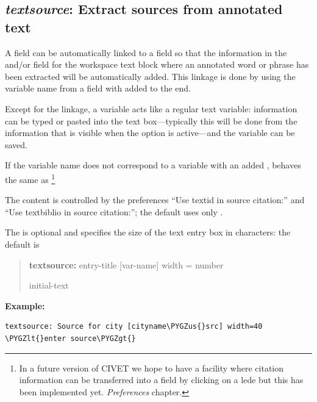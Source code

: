 \documentclass[letterpaper,10pt,english]{sphinxmanual}
\def\PYGZus{\char`\_}
\def\PYGZlt{\char`\<}
\def\PYGZgt{\char`\>}
\begin{document}
\subsection{\emph{textsource}: Extract sources from annotated text}
\label{forms:textsource-extract-sources-from-annotated-text}
A  field can be automatically linked to a 
field so that the information in the  and/or  field
for the workspace text block where an annotated word or phrase has been
extracted will be automatically added. This linkage is done by using
the variable name from a  field with  added to the
end.

Except for the linkage, a  variable acts like a regular text
variable: information can be typed or pasted into the text box—typically this
will be done from the  information that is visible when the
 option is active—and the variable can be saved.

If the variable name does not correspond to a  variable with
an added ,  behaves the same as   \footnote{
In a future version of CIVET we hope to have a facility where citation
information can be transferred into a  field by clicking on
a lede but this has been implemented yet.
\emph{Preferences} chapter.
}

The  content is controlled by the preferences
“Use textid in source citation:” and “Use textbiblio in source citation:”;
the default uses only .

The  is optional and specifies the size of the text
entry box in characters: the default is 
\begin{quote}

\begin{DUlineblock}{0em}
\item[] \textbf{textsource:} entry-title {[}var-name{]}  width = number
\item[] initial-text
\end{DUlineblock}
\end{quote}

\textbf{Example:}

\begin{Verbatim}[commandchars=\\\{\}]
textsource: Source for city [cityname\PYGZus{}src] width=40
\PYGZlt{}enter source\PYGZgt{}
\end{Verbatim}
\end{document}
